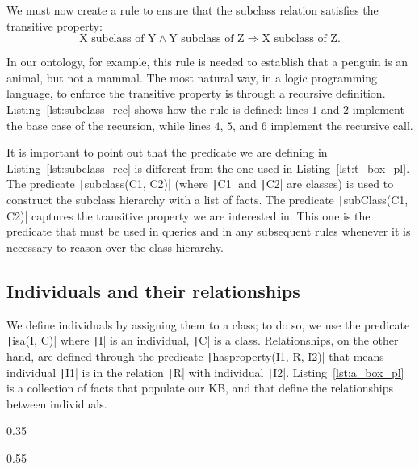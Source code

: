 We must now create a rule to ensure that the subclass relation satisfies the transitive property:
\[
\text{X subclass of Y}\land\text{Y subclass of Z}\Rightarrow\text{X subclass of Z.}
\]

In our ontology, for example,  this rule is needed to establish that a penguin is an animal, but not a mammal. The most natural way, in a logic programming language, to enforce the transitive property is through a recursive definition. Listing~\ref{lst:subclass_rec} shows how the rule is defined: lines $1$ and $2$ implement the base case of the recursion, while lines $4$, $5$, and $6$ implement the recursive call.

\begin{listingenv}[h]
	\caption{Recursive definition of subclass predicate}
	\label{lst:subclass_rec}
\end{listingenv}

It is important to point out that the predicate we are defining in Listing~\ref{lst:subclass_rec} is different from the one used in Listing~\ref{lst:t_box_pl}. The predicate \texttt|subclass(C1, C2)| (where \texttt|C1| and \texttt|C2| are classes) is used to construct the subclass hierarchy with a list of facts. The predicate \texttt|subClass(C1, C2)| captures the transitive property we are interested in. This one is the predicate that must be used in queries and in any subsequent rules whenever it is necessary to reason over the class hierarchy.

\subsection{Individuals and their relationships}
We define individuals by assigning them to a class; to do so, we use the predicate \texttt|isa(I, C)| where \texttt|I| is an individual, \texttt|C| is a class. Relationships, on the other hand, are defined through the predicate \texttt|hasproperty(I1, R, I2)| that means individual \texttt|I1| is in the relation \texttt|R| with individual \texttt|I2|. Listing~\ref{lst:a_box_pl} is a collection of facts that populate our KB, and that define the relationships between individuals.

\begin{listingenv}[h]
	\centering
	\begin{sublisting}[c]{0.35\linewidth}
		\caption{Individuals definitions}
		\label{lst:a_box_pl_ind}
	\end{sublisting}
	\qquad
	\begin{sublisting}[c]{0.55\linewidth}
		\caption{Relationships definitions}
		\label{lst:a_box_pl_rel}
	\end{sublisting}
	\caption{A-Box definition}
	\label{lst:a_box_pl}
\end{listingenv}



